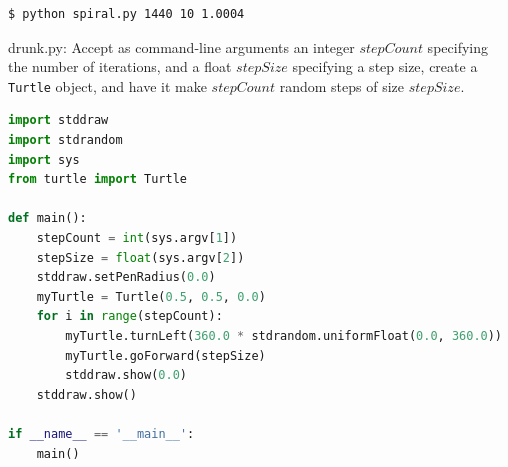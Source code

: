 \documentclass[8pt,a4paper,compress]{beamer}
\begin{document}
\begin{frame}[fragile]
\begin{minipage}{200pt}
\begin{lstlisting}[language={}]
$ python spiral.py 1440 10 1.0004
\end{lstlisting}
\end{minipage}%
\hfill
\begin{minipage}{100pt}
\begin{center}
\end{center}
\end{minipage}
\end{frame}

\begin{frame}[fragile]
\pause

\begin{framed}
\tiny drunk.py: Accept as command-line arguments an integer $stepCount$ specifying the number of iterations, and a float $stepSize$ specifying a step size, create a \lstinline{Turtle} object, and have it make $stepCount$ random steps of size $stepSize$.
\end{framed}

\begin{lstlisting}[language=Python]
import stddraw
import stdrandom
import sys
from turtle import Turtle

def main():
    stepCount = int(sys.argv[1])
    stepSize = float(sys.argv[2])
    stddraw.setPenRadius(0.0)
    myTurtle = Turtle(0.5, 0.5, 0.0)
    for i in range(stepCount):
        myTurtle.turnLeft(360.0 * stdrandom.uniformFloat(0.0, 360.0))
        myTurtle.goForward(stepSize)
        stddraw.show(0.0)
    stddraw.show()

if __name__ == '__main__':
    main()
\end{lstlisting}
\end{frame}
\end{document}
